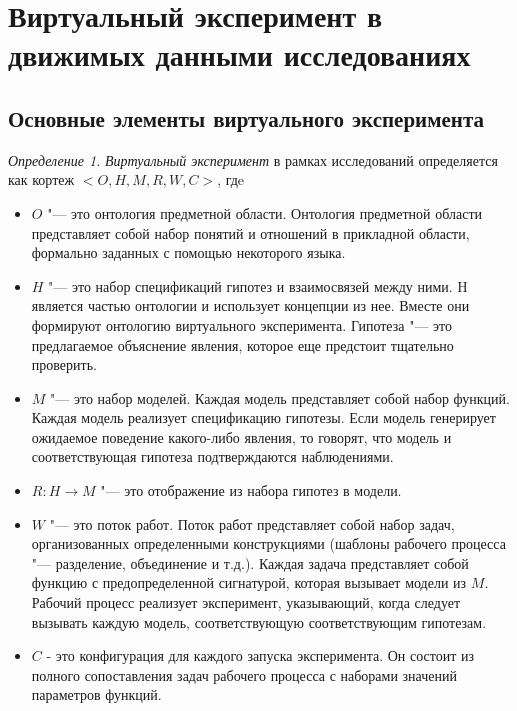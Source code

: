 \chapter{Виртуальный эксперимент в движимых данными исследованиях} \label{chapt2}
\newtheorem{mydef}{Definition}

\section{Основные элементы виртуального эксперимента} \label{sect2_1}

\textit{Определение 1.} \textit{Виртуальный эксперимент} в рамках исследований определяется как 
кортеж $<O, H, M, R, W, C>$, гдe
\begin{itemize}
    \item $O$ "--- это онтология предметной области. Онтология предметной области представляет собой набор понятий и 
            отношений в прикладной области, формально заданных с помощью некоторого языка.
    \item $H$ "--- это набор спецификаций гипотез и взаимосвязей между ними. H является частью онтологии и использует 
            концепции из нее. Вместе они формируют онтологию виртуального эксперимента. Гипотеза "--- это предлагаемое 
            объяснение явления, которое еще предстоит тщательно проверить. 
    \item $M$ "--- это набор моделей. Каждая модель представляет собой набор функций. Каждая модель реализует 
            спецификацию гипотезы. Если модель генерирует ожидаемое поведение какого-либо явления, то говорят, что 
            модель и соответствующая гипотеза подтверждаются наблюдениями.
    \item $R: H \to M$ "--- это отображение из набора гипотез в модели.
    \item $W$ "--- это поток работ. Поток работ представляет собой набор задач, организованных определенными 
            конструкциями (шаблоны рабочего процесса "--- разделение, объединение и т.д.). Каждая задача представляет 
            собой функцию с предопределенной сигнатурой, которая вызывает модели из $M$. Рабочий процесс реализует 
            эксперимент, указывающий, когда следует вызывать каждую модель, соответствующую соответствующим гипотезам. 
    \item $C$ - это конфигурация для каждого запуска эксперимента. Он состоит из полного сопоставления задач 
            рабочего процесса с наборами значений параметров функций.
\end{itemize}

